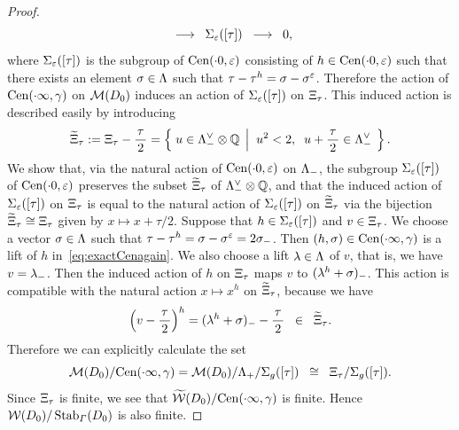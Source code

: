 \documentclass{amsart} %
\begin{document}
\begin{proof}
\begin{equation}
\;\; \longrightarrow \;\; 
\Sigma_{\varepsilon}([\tau])
\;\; \longrightarrow \;\; 0,
\end{equation}
%
where $\Sigma_{\varepsilon}([\tau])$ is the subgroup of $\mathrm{Cen}(\cdot 0, \varepsilon)$
consisting of $h\in \mathrm{Cen}(\cdot 0, \varepsilon)$ such that 
there exists an element $\sigma\in \Lambda$ such that $\tau-\tau^h=\sigma-\sigma^{\varepsilon}$.
Therefore the action 
of $\mathrm{Cen}(\cdot \infty, \gamma)$ on $\mathord{\mathcal{M}}(D_0)$ induces an action of 
$\Sigma_{\varepsilon}([\tau])$ on $\Xi_{\tau}$. 
This induced action is described easily by introducing 
%
\begin{equation}\label{eq:tilXi}
\widetilde{\Xi}_{\tau}:=\Xi_{\tau} -\dfrac{\tau}{\,2\,}
=\left\{\; {u\in \Lambda_{-}^{\vee}\otimes\mathord{\mathbb{Q}}} \; \left\vert \; {\;u^2<2, \;\; u+\dfrac{\tau}{\,2\,}\in \Lambda_{-}^{\vee}} \; \right.\right \}.
\end{equation}
%
We show that, via the natural action of $\mathrm{Cen}(\cdot 0, \varepsilon)$ on $\Lambda_{-}$,
the subgroup 
$\Sigma_{\varepsilon}([\tau])$ of $\mathrm{Cen}(\cdot 0, \varepsilon)$
preserves the subset $\widetilde{\Xi}_{\tau}$ of $\Lambda_{-}^{\vee}\otimes\mathord{\mathbb{Q}}$,
and that 
the induced action of 
$\Sigma_{\varepsilon}([\tau])$ on $\Xi_{\tau}$
is equal to the natural action of $\Sigma_{\varepsilon}([\tau])$ on $\widetilde{\Xi}_{\tau}$
via the 
bijection $\widetilde{\Xi}_{\tau}\cong \Xi_{\tau}$ given by 
$x\mapsto x+\tau/2$.
Suppose that $h\in \Sigma_{\varepsilon}([\tau])$ and $v\in \Xi_{\tau}$.
We choose a vector $\sigma\in \Lambda$ such that $\tau-\tau^h=\sigma-\sigma^\varepsilon=2\sigma_{-}$.
Then $(h, \sigma)\in \mathrm{Cen}(\cdot \infty, \gamma)$ is a lift of $h$ in~\eqref{eq:exactCenagain}.
We also choose a lift $\lambda\in \Lambda$ of $v$,
that is, we have $v=\lambda\sb{-}$.
Then the induced action of $h$ on $\Xi_{\tau}$ maps $v$ to $(\lambda^h+\sigma)\sb{-}$.
This action is compatible with the natural action $x\mapsto x^h$ on $\widetilde{\Xi}_{\tau}$, because we have 
\[
\left(v-\dfrac{\tau}{\,2\,}\right)^h=(\lambda^h+\sigma)_{-}-\dfrac{\tau}{\,2\,}\;\;\in\;\;\widetilde{\Xi}_{\tau}.
\]
Therefore we can explicitly calculate  the set 
%
\begin{equation}\label{eq:orbitss}
 \mathord{\mathcal{M}}(D_0)/\mathrm{Cen}(\cdot \infty, \gamma)= \mathord{\mathcal{M}}(D_0)/\Lambda_{+}/\Sigma_{g}([\tau])\;\;\cong\;\; \Xi_{\tau}/\Sigma_{g}([\tau]). 
\end{equation}
%
Since $\Xi_{\tau}$ is finite, 
we see that 
$\widetilde{\mathord{\mathcal{W}}}(D_0)/\mathrm{Cen}(\cdot \infty, \gamma)$ is finite. 
Hence  $\mathord{\mathcal{W}}(D_0)/\operatorname{Stab}_{\varGamma}(D_0)$ is also finite. 
%
\end{proof}
%
\end{document}
